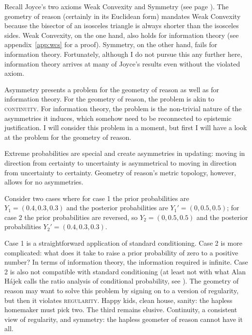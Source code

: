 \documentclass[phd,12pt,oneside]{ubcthesis}
\begin{document}
Recall Joyce's two axioms Weak Convexity and Symmetry (see page
\pageref{quot:weakconv}). The geometry of reason (certainly in its
Euclidean form) mandates Weak Convexity because the bisector of an
isosceles triangle is always shorter than the isosceles sides. Weak
Convexity, on the one hand, also holds for information theory (see
appendix~\ref{app:wcs} for a proof). Symmetry, on the
other hand, fails for information theory. Fortunately, although I do not
pursue this any further here, information theory arrives at many of
Joyce's results even without the violated axiom.

Asymmetry presents a problem for the geometry of reason as well as for
information theory. For the geometry of reason, the problem is akin to
\textsc{continuity}. For information theory, the problem is the
non-trivial nature of the asymmetries it induces, which somehow need
to be reconnected to epistemic justification. I will consider this
problem in a moment, but first I will have a look at the problem for
the geometry of reason.

Extreme probabilities are special and create asymmetries in updating:
moving in direction from certainty to uncertainty is asymmetrical to
moving in direction from uncertainty to certainty. Geometry of
reason's metric topology, however, allows for no asymmetries.

\begin{quotex}
  \label{ex:extreme} Consider two cases
  where for case 1 the prior probabilities are $Y_{1}=(0.4,0.3,0.3)$
  and the posterior probabilities are $Y_{1}'=(0,0.5,0.5)$; for case 2
  the prior probabilities are reversed, so $Y_{2}=(0,0.5,0.5)$ and the
  posterior probabilities $Y_{2}'=(0.4,0.3,0.3)$.
\end{quotex}

{\noindent}Case 1 is a straightforward application of standard conditioning. Case
2 is more complicated: what does it take to raise a prior probability
of zero to a positive number? In terms of information theory, the
information required is infinite. Case 2 is also not compatible with
standard conditioning (at least not with what Alan H{\'a}jek calls the
ratio analysis of conditional probability, see ).
The geometry of reason may want to solve this problem by signing on to
a version of regularity, but then it violates \textsc{regularity}.
Happy kids, clean house, sanity: the hapless homemaker must pick two.
The third remains elusive. Continuity, a consistent view of
regularity, and symmetry: the hapless geometer of reason cannot have
it all.
\end{document}
